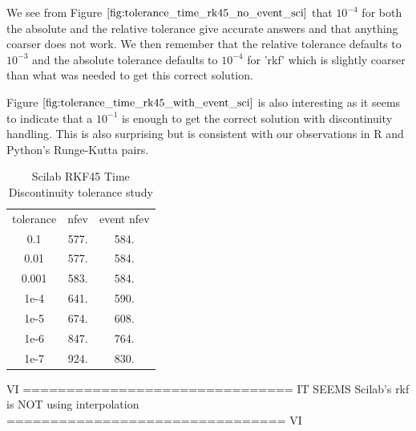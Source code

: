 We see from Figure $\ref{fig:tolerance_time_rk45_no_event_sci}$ that $10^{-4}$ for both the absolute and the relative tolerance give accurate answers and that anything coarser does not work. We then remember that the relative tolerance defaults to $10^{-3}$ and the absolute tolerance defaults to $10^{-4}$ for 'rkf' which is slightly coarser than what was needed to get this correct solution.

Figure $\ref{fig:tolerance_time_rk45_with_event_sci}$ is also interesting as it seems to indicate that a $10^{-1}$ is enough to get the correct solution with discontinuity handling. This is also surprising but is consistent with our observations in R and Python's Runge-Kutta pairs.

\begin{table}[h]
\caption {Scilab RKF45 Time Discontinuity tolerance study} 
\label{tab:tolerance_time_discontinuity_rk45_scilab} 
\begin{center}
\begin{tabular}{ c c c }
tolerance & nfev  & event nfev \\ 
    0.1  & 577.  & 584. \\
    0.01  & 577. & 584. \\
    0.001  & 583. &  584. \\
    1e-4  & 641.  &  590. \\
    1e-5  & 674.  &  608. \\
    1e-6 &  847.  &  764. \\
    1e-7  & 924.  & 830.   \\
\end{tabular}
\end{center}
\end{table}

VI ===============================
IT SEEMS Scilab's rkf is NOT using interpolation
================================ VI

